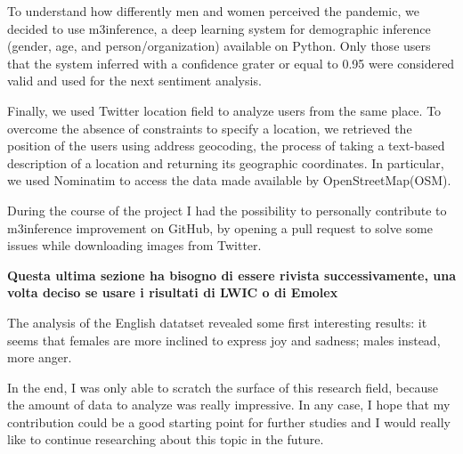 To understand how differently men and women perceived the pandemic, we decided to use m3inference, a deep learning system for demographic inference (gender, age, and person/organization) available on Python. Only those users that the system inferred with a confidence grater or equal to 0.95 were considered valid and used for the next sentiment analysis.

Finally, we used Twitter location field to analyze users from the same place. To overcome the absence of constraints to specify a location, we retrieved the position of the users using address geocoding, the process of taking a text-based description of a location and returning its geographic coordinates. In particular, we used Nominatim to access the data made available by OpenStreetMap(OSM).

During the course of the project I had the possibility to personally contribute to m3inference improvement on GitHub, by opening a pull request to solve some issues while downloading images from Twitter.


\textbf{Questa ultima sezione ha bisogno di essere rivista successivamente, una volta deciso se usare i risultati di LWIC o di Emolex}

The analysis of the English datatset revealed some first interesting results: it seems that females are more inclined to express joy and sadness; males instead, more anger.

In the end, I was only able to scratch the surface of this research field, because the amount of data to analyze was really impressive. In any case, I hope that my contribution could be a good starting point for further studies and I would really like to continue researching about this topic in the future.
